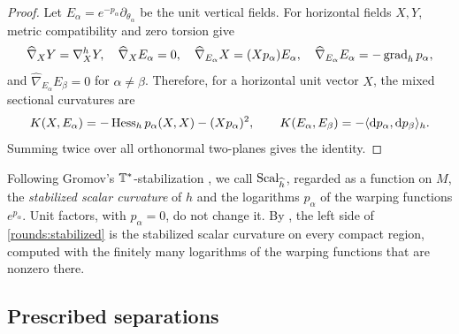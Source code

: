\begin{proof}
Let \(E_\alpha=e^{-p_\alpha}\partial_{\theta_\alpha}\) be the unit
vertical fields. For horizontal fields \(X,Y\), metric compatibility and zero torsion give
\[
 \widehat\nabla_XY=\nabla^h_XY,\quad
 \widehat\nabla_XE_\alpha=0,\quad
 \widehat\nabla_{E_\alpha}X=(Xp_\alpha)E_\alpha,\quad
 \widehat\nabla_{E_\alpha}E_\alpha=-\operatorname{grad}_h p_\alpha,
\]
and \(\widehat\nabla_{E_\alpha}E_\beta=0\) for \(\alpha\ne\beta\).
Therefore, for a horizontal unit vector \(X\), the mixed sectional
curvatures are
\[
 K(X,E_\alpha)=-\operatorname{Hess}_h p_\alpha(X,X)-(Xp_\alpha)^2,
 \qquad
 K(E_\alpha,E_\beta)=-\langle\mathrm d p_\alpha,\mathrm d p_\beta\rangle_h.
\]
Summing twice over all orthonormal two-planes gives the identity.
\end{proof}

Following Gromov's \(\mathbb T^*\)-stabilization \citep[\S1]{gromov2020Aspherical},
we call \(\operatorname{Scal}_{\widehat h}\), regarded as a function on \(M\), the
\emph{stabilized scalar curvature} of \(h\) and the logarithms
\(p_\alpha\) of the warping functions \(e^{p_\alpha}\). Unit factors, with \(p_\alpha=0\), do not change it. By
, the left side of \eqref{rounds:stabilized}
is the stabilized scalar curvature on every compact region, computed
with the finitely many logarithms of the warping functions that are nonzero there.

\subsection{Prescribed separations}

